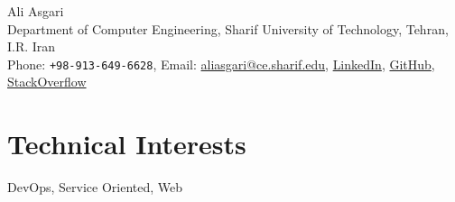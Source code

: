 \documentclass[10pt, a4paper]{article}
\begin{document}
{\LARGE Ali Asgari}\\[1cm]
Department of Computer Engineering, Sharif University of Technology, Tehran, I.R. Iran\\[.2cm]
Phone: \texttt{+98-913-649-6628}, Email: \href{mailto:aliasgari@ce.sharif.edu}{aliasgari@ce.sharif.edu},  \href{https://www.linkedin.com/in/ali-asgari-51981884/}{LinkedIn}, \href{https://github.com/altostratous}{GitHub}, \href{https://stackoverflow.com/users/2656621/ali-asgari?tab=profile}{StackOverflow}\\ 


\section*{Technical Interests}
DevOps, Service Oriented, Web
\end{document}
